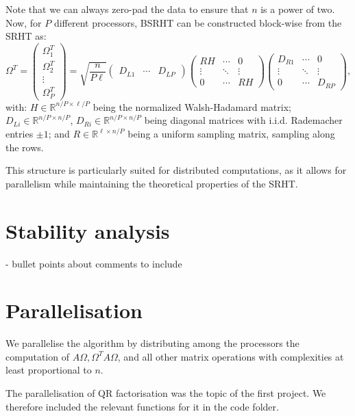 \documentclass[a4paper, 12pt,oneside]{article}
\begin{document}
Note that we can always zero-pad the data to ensure that $n$ is a power of two. Now, for $P$ different processors, BSRHT can be constructed block-wise from the SRHT as:
\[
\Omega^T = \begin{pmatrix} \Omega_1^T \\
\Omega_2^T \\
\vdots \\
\Omega_P^T \end{pmatrix} = \sqrt{\frac{n}{P\ell}} \begin{pmatrix} D_{L1} & \cdots & D_{LP} \end{pmatrix}
\begin{pmatrix}
RH & \cdots & 0 \\
\vdots & \ddots & \vdots \\
0 & \cdots & RH
\end{pmatrix}
\begin{pmatrix} D_{R1} & \cdots & 0 \\
\vdots & \ddots & \vdots \\
0 & \cdots & D_{RP} \end{pmatrix}, \tag{2}
\]
with: $H \in \mathbb{R}^{n/P \times \ell/P}$ being the normalized Walsh-Hadamard matrix; $D_{Li} \in \mathbb{R}^{n/P \times n/P}$, $D_{Ri} \in \mathbb{R}^{n/P \times n/P}$ being diagonal matrices with i.i.d. Rademacher entries $\pm 1$; and $R \in \mathbb{R}^{\ell \times n/P}$ being a uniform sampling matrix, sampling along the rows.

This structure is particularly suited for distributed computations, as it allows for parallelism while maintaining the theoretical properties of the SRHT.


	\section{Stability analysis}
		- bullet points about comments to include 
	\section{Parallelisation}
	We parallelise the algorithm by distributing among the processors the computation of $A \Omega,\Omega^T A \Omega$, and all other matrix operations with complexities at least proportional to $n$. 
	
	The parallelisation of QR factorisation was the topic of the first project. We therefore included the relevant functions for it in the code folder. 
	
\end{document}
